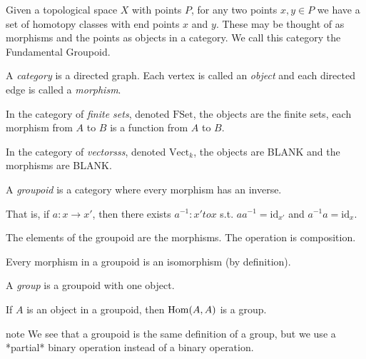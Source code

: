 \documentclass[11pt,leqno,oneside]{amsart}
\newenvironment{dateenv}{
  \vspace{1em}
}{
  \vspace{1em}
}
\newcommand{\mydate}[4]{
  \newdate{#1}{#2}{#3}{#4}
  \begin{dateenv}
    \hfill\displaydate{#1}
  \end{dateenv}
}
\numberwithin{thm}{section}
\newcommand{\id}{\text{id}}
\newcommand{\de}{\emph}
\begin{document}
Given a topological space \(X\) with points \(P\), for any two points
\(x,y \in P\) we have a set of homotopy classes with end points \(x\)
and \(y\). These may be thought of as morphisms and the points as
objects in a category. We call this category the Fundamental Groupoid.

\mydate{d2}{20}{1}{2017}

\begin{defn}
  A \de{category} is a directed graph.  Each vertex is called an \de{object} and each directed edge is called a \de{morphism}.
\end{defn}
\begin{defn}
  In the category of \de{finite sets}, denoted $\text{FSet}$, the objects are the finite sets, each morphism from $A$ to $B$ is a function from $A$ to $B$.
\end{defn}
\begin{defn}
  In the category of \de{vectorsss}, denoted $\text{Vect}_k$, the objects are BLANK and the morphisms are BLANK.
\end{defn}
\begin{defn}
  A \de{groupoid} is a category where every morphism has an inverse.

  That is, if $a: x \to x'$, then there exists $a^{-1}:x' to x$ s.t. $aa^{-1} = \id_{x'}$ and $a^{-1}a = \id_{x}$.

  The elements of the groupoid are the morphisms.  The operation is composition.
\end{defn}
\begin{prop}
  Every morphism in a groupoid is an isomorphism (by definition).
\end{prop}
\begin{defn}
  A \de{group} is a groupoid with one object.
\end{defn}
\begin{prop}
  If $A$ is an object in a groupoid, then $\operatorname{Hom}(A, A)$ is a group.
\end{prop}

note
We see that a groupoid is the same definition of a group, but we use a *partial* binary operation instead of a binary operation.
\end{document}
